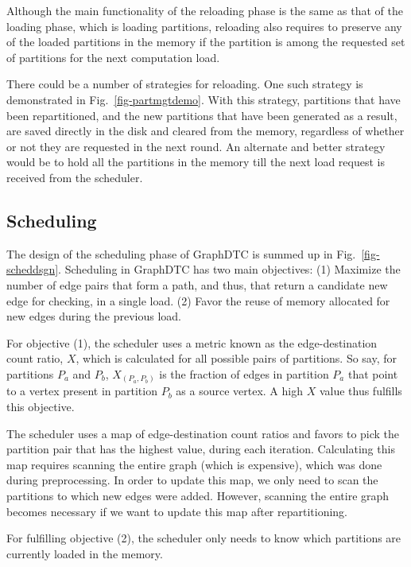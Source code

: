 \documentclass[10pt,preprint]{sigplanconf}
\begin{document}
Although the main functionality of the reloading phase is the same as that of the loading phase, which is loading partitions, reloading also requires to preserve any of the loaded partitions in the memory if the partition is among the requested set of partitions for the next computation load. 

There could be a number of strategies for reloading. One such strategy is demonstrated in Fig.~\ref{fig-partmgtdemo}. With this strategy, partitions that have been repartitioned, and the new partitions that have been generated as a result, are saved directly in the disk and cleared from the memory, regardless of whether or not they are requested in the next round. An alternate and better strategy would be to hold all the partitions in the memory till the next load request is received from the scheduler. 

\subsection{Scheduling}
\label{subsec:sch}

The  design of the scheduling phase of GraphDTC is summed up in Fig.~\ref{fig-scheddsgn}. Scheduling in GraphDTC has two main objectives: (1) Maximize the number of edge pairs that form a path, and thus, that return a candidate new edge for checking, in a single load. (2) Favor the reuse of memory allocated for new edges during the previous load. 

For objective (1), the scheduler uses a metric known as the edge-destination count ratio, $X$, which is calculated for all possible pairs of partitions. So say, for partitions $P_a$ and $P_b$, $X_{({P_a},{P_b})}$ is the fraction of edges in partition $P_a$ that point to a vertex present in partition $P_b$ as a source vertex. A high $X$ value thus fulfills this objective. 

The scheduler uses a map of edge-destination count ratios and favors to pick the partition pair that has the highest value, during each iteration. Calculating this map requires scanning the entire graph (which is expensive), which was done during preprocessing. In order to update this map, we only need to scan the partitions to which new edges were added. However, scanning the entire graph becomes necessary if we want to update this map after repartitioning. 

For fulfilling objective (2), the scheduler only needs to know which partitions are currently loaded in the memory. 
\end{document}
